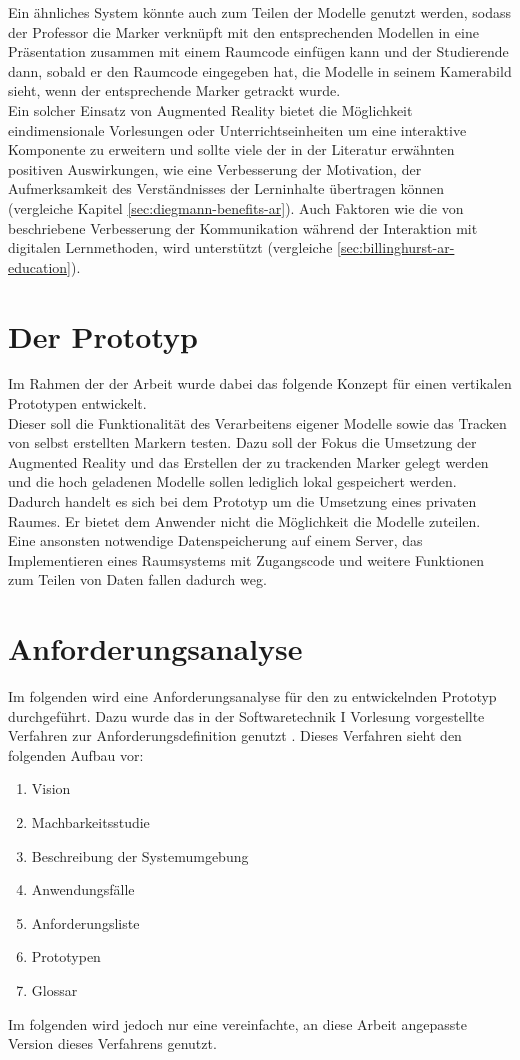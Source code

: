 Ein ähnliches System könnte auch zum Teilen der Modelle genutzt werden, sodass der Professor die Marker verknüpft mit den entsprechenden Modellen in eine Präsentation zusammen mit einem Raumcode einfügen kann und der Studierende dann, sobald er den Raumcode eingegeben hat, die Modelle in seinem Kamerabild sieht, wenn der entsprechende Marker getrackt wurde.\\
Ein solcher Einsatz von Augmented Reality bietet die Möglichkeit eindimensionale Vorlesungen oder Unterrichtseinheiten um eine interaktive Komponente zu erweitern und sollte viele der in der Literatur erwähnten positiven Auswirkungen, wie 
eine Verbesserung der  Motivation, der Aufmerksamkeit des Verständnisses der Lerninhalte übertragen können (vergleiche Kapitel \ref{sec:diegmann-benefits-ar}). Auch Faktoren wie die von \citeauthor{billinghurst:ar-in-education} beschriebene Verbesserung der Kommunikation während der Interaktion mit digitalen Lernmethoden, wird unterstützt (vergleiche \ref{sec:billinghurst-ar-education}).

\section{Der Prototyp}
Im Rahmen der der Arbeit wurde dabei das folgende Konzept für einen vertikalen Prototypen entwickelt. \\
Dieser soll die Funktionalität des Verarbeitens eigener Modelle sowie das Tracken von selbst erstellten Markern testen.
Dazu soll der Fokus die Umsetzung der Augmented Reality und das Erstellen der zu trackenden Marker gelegt werden und die hoch geladenen Modelle sollen lediglich lokal gespeichert werden. \\
Dadurch handelt es sich bei dem Prototyp um die Umsetzung eines \glqq privaten Raumes\grqq . Er bietet dem Anwender nicht die Möglichkeit die Modelle zuteilen.\\ 
Eine ansonsten notwendige Datenspeicherung auf einem Server, das Implementieren eines Raumsystems mit Zugangscode und weitere Funktionen zum Teilen von Daten fallen dadurch weg.

\section{Anforderungsanalyse}\label{sec:Anforderungsanalyse}
Im folgenden wird eine Anforderungsanalyse für den zu entwickelnden Prototyp durchgeführt.
Dazu wurde das in der Softwaretechnik I Vorlesung vorgestellte Verfahren zur Anforderungsdefinition genutzt \citep[Folie 209-214]{winter:srs-anforderungen}. 
Dieses Verfahren sieht den folgenden Aufbau vor:
\begin{enumerate}
\item Vision 
\item Machbarkeitsstudie
\item Beschreibung der Systemumgebung
\item Anwendungsfälle
\item Anforderungsliste
\item Prototypen
\item Glossar
\end{enumerate}
Im folgenden wird jedoch nur eine vereinfachte, an diese Arbeit angepasste Version dieses Verfahrens genutzt.

